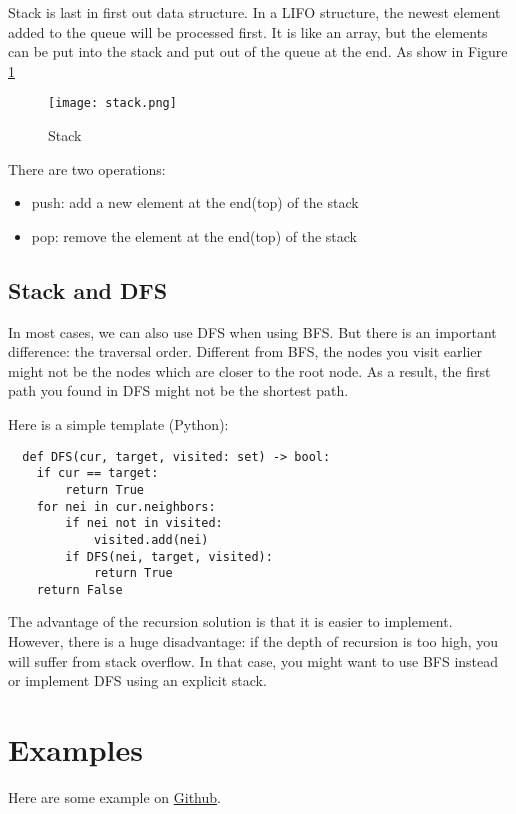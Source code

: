 Stack is last in first out data structure.
In a LIFO structure, the newest element added to the queue will be processed first.
It is like an array, but the elements can be put into the stack and put out of the queue at the end.
As show in Figure \ref{fig:stack}
\begin{figure}[!ht]
  \centering
  \texttt{[image: stack.png]}
  \caption{Stack}
  \label{fig:stack}
\end{figure}


There are two operations:
\begin{itemize}
\item push: add a new element at the end(top) of the stack
\item pop: remove the element at the end(top) of the stack
\end{itemize}

\subsection{Stack and DFS}
\label{sec:stack-dfs}

In most cases, we can also use DFS when using BFS. But there is an important difference: the traversal order.
Different from BFS, the nodes you visit earlier might not be the nodes which are closer to the root node.
As a result, the first path you found in DFS might not be the shortest path.

Here is a simple template (Python):
\lstset{language=Python}
\begin{lstlisting}
  def DFS(cur, target, visited: set) -> bool:
    if cur == target:
        return True
    for nei in cur.neighbors:
        if nei not in visited:
            visited.add(nei)
        if DFS(nei, target, visited):
            return True
    return False
\end{lstlisting}


The advantage of the recursion solution is that it is easier to implement.
However, there is a huge disadvantage: if the depth of recursion is too high, you will suffer from stack overflow.
In that case, you might want to use BFS instead or implement DFS using an explicit stack.

\section{Examples}
\label{sec:examples-2}

Here are some example on \href{https://github.com/mingmingli916/algorithms/tree/main/queque_and_stack}{Github}.



  


